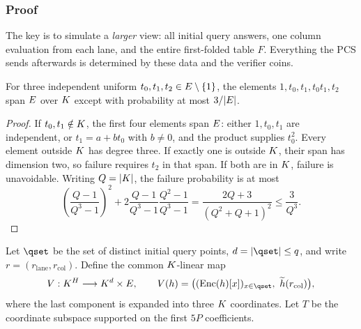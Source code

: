 \subsubsection{Proof}

The key is to simulate a \emph{larger} view: all initial query answers, one column evaluation from each lane, and the entire first-folded table $F$. Everything the PCS sends afterwards is determined by these data and the verifier coins.

\begin{lemma}\label{lem:five}
For three independent uniform $t_0,t_1,t_2\in E\setminus\{1\}$, the elements $1,t_0,t_1,t_0t_1,t_2$ span $E$ over $K$ except with probability at most $3/|E|$.
\end{lemma}
\begin{proof}
If $t_0,t_1\notin K$, the first four elements span $E$: either $1,t_0,t_1$ are independent, or $t_1=a+bt_0$ with $b\ne0$, and the product supplies $t_0^2$. Every element outside $K$ has degree three. If exactly one is outside $K$, their span has dimension two, so failure requires $t_2$ in that span. If both are in $K$, failure is unavoidable. Writing $Q=|K|$, the failure probability is at most
\[
 \left(\frac{Q-1}{Q^3-1}\right)^2
 +2\frac{Q-1}{Q^3-1}\frac{Q^2-1}{Q^3-1}
 =\frac{2Q+3}{(Q^2+Q+1)^2}
 \le\frac3{Q^3}.
\]
\end{proof}

Let $\qset$ be the set of distinct initial query points, $d=|\qset|\le q$, and write $r=(r_{\mathrm{lane}},r_{\mathrm{col}})$. Define the common $K$-linear map
\[
 V:\K^H\longrightarrow\K^d\times\E,
 \qquad V(h)=\bigl((\Enc(h)[x])_{x\in\qset},\ \mle h(r_{\mathrm{col}})\bigr),
\]
where the last component is expanded into three $K$ coordinates. Let $T$ be the coordinate subspace supported on the first $5P$ coefficients.

